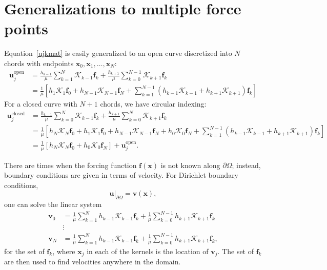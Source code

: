 \documentclass[12pt]{article}
\newcommand{\bx}{\mathbf{x}}
\newcommand{\bu}{\mathbf{u}}
\newcommand{\bv}{\mathbf{v}}
\newcommand{\ff}{\mathbf{f}}
\newcommand{\baa}[1]{\begin{align} #1 \end{align}}
\begin{document}
	
	\section{Generalizations to multiple force points}
	
	Equation~\eqref{ujkmat} is easily generalized to an open curve discretized into $N$ chords with endpoints $\bx_0, \bx_1, \dotsc, \bx_N$:
	\baa{
	\bu_j^{\text{open}} & = \frac{h_{k-1}}{\mu}\sum_{k=1}^N \mathcal{K}_{k-1}\ff_k + \frac{h_{k+1}}{\mu}\sum_{k=0}^{N-1} \mathcal{K}_{k+1}\ff_k \nonumber \\
	& =  \frac{1}{\mu}\left[  h_1\mathcal{K}_{1}\ff_0 + h_{N-1}\mathcal{K}_{N-1}\ff_N  + \sum_{k=1}^{N-1} \left(h_{k-1}\mathcal{K}_{k-1}+h_{k+1}\mathcal{K}_{k+1}\right) \ff_k  \right]\label{opencurve}
	}	
	For a closed curve with $N+1$ chords, we have circular indexing: 
	\baa{
	\bu_j^{\text{closed}} & = \frac{h_{k-1}}{\mu}\sum_{k=0}^N \mathcal{K}_{k-1}\ff_k + \frac{h_{k+1}}{\mu}\sum_{k=0}^{N} \mathcal{K}_{k+1}\ff_k \nonumber \\
	& =  \frac{1}{\mu}\left[  h_N\mathcal{K}_{N}\ff_0 + h_1\mathcal{K}_{1}\ff_0+ h_{N-1}\mathcal{K}_{N-1}\ff_N + h_0\mathcal{K}_{0}\ff_N + \sum_{k=1}^{N-1} \left(h_{k-1}\mathcal{K}_{k-1}+h_{k+1}\mathcal{K}_{k+1}\right) \ff_k  \right] \nonumber \\
	& = \frac{1}{\mu}\left[  h_N\mathcal{K}_{N}\ff_0 + h_0\mathcal{K}_{0}\ff_N \right] + \bu_j^{\text{open}}. \label{closedcurve}
	}	
	 
	
	There are times when the forcing function $\ff(\bx)$ is not known along $\partial\Omega$; instead, boundary conditions are given in terms of velocity. For Dirichlet boundary conditions, 
	\[ \bu\big|_{\partial\Omega} = \bv(\bx),\]
	one can solve the linear system
	\baa{
	\bv_0 & =  \frac{1}{\mu}\sum_{k=1}^N h_{k-1}\mathcal{K}_{k-1}\ff_k +  \frac{1}{\mu}\sum_{k=0}^{N-1} h_{k+1}\mathcal{K}_{k+1}\ff_k  \nonumber \\
	& \vdots  \nonumber \\
	\bv_N & =  \frac{1}{\mu}\sum_{k=1}^N h_{k-1}\mathcal{K}_{k-1}\ff_k +  \frac{1}{\mu}\sum_{k=0}^{N-1} h_{k+1}\mathcal{K}_{k+1}\ff_k, \label{linsys}
	}
	for the set of $\ff_k$, where $\bx_j$ in each of the kernels is the location of $\bv_j$. The set of $\ff_k$ are then used to find velocities anywhere in the domain.
	
\end{document}
